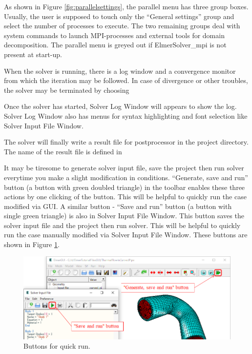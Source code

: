 As shown in Figure \ref{fig:parallelsettings}, the parallel menu has three group boxes. Usually, the user is supposed to touch
only the ``General settings'' group and select the number of processes to execute.
The two remaining groups deal with system commands to launch MPI-processes and
external tools for domain decomposition.  The parallel menu is greyed out if
ElmerSolver\_mpi is not present at start-up.

When the solver is running, there is a log window and a convergence monitor
from which the iteration may be followed. In case of divergence or other troubles,
the solver may be terminated by choosing

Once the solver has started, Solver Log Window will appears to show the log. Solver Log Window also has menus for syntax highlighting and font selection like Solver Input File Window. 

The solver will finally write a result file for postprocessor in the project directory.
The name of the result file is defined in

It may be tiresome to generate solver input file, save the project then run solver everytime you make a slight modification in conditions. ``Generate, save and run'' button (a button with green doubled triangle) in the toolbar enables these three actions by one clicking of the button. This will be helpful to quickly run the case modified via GUI.
A similar button - ``Save and run'' button (a button with single green triangle) is also in Solver Input File Window. This button saves the solver input file and the project then run solver. This will be helpful to quickly run the case manually modified via Solver Input File Window. 
These buttons are shown in Figure \ref{fig:quickbuttons}.

\begin{figure}[htb]
	\begin{center}
		\includegraphics[scale=0.5]{images/quickrunbuttons.png}
		\caption{Buttons for quick run.}
		\label{fig:quickbuttons}
	\end{center}
\end{figure}
